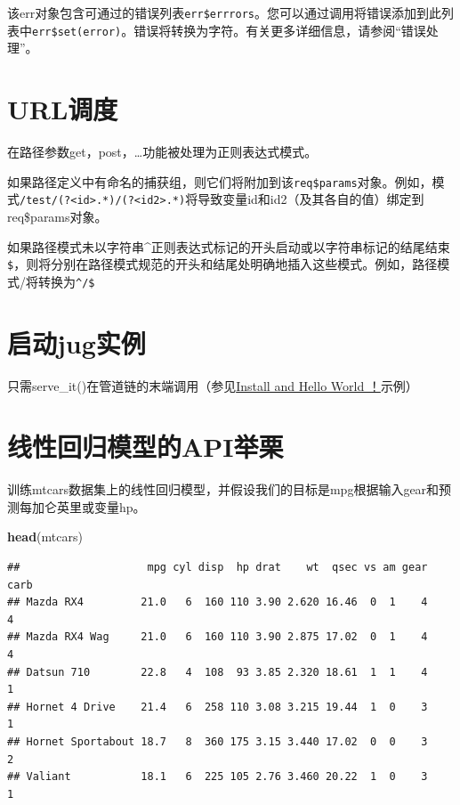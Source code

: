 \documentclass[]{book}
\newenvironment{Shaded}{\begin{snugshade}}{\end{snugshade}}
\newcommand{\KeywordTok}[1]{\textcolor[rgb]{0.13,0.29,0.53}{\textbf{#1}}}
\newcommand{\NormalTok}[1]{#1}
\begin{document}
该err对象包含可通过的错误列表\texttt{err\$errrors}。您可以通过调用将错误添加到此列表中\texttt{err\$set(error)}。错误将转换为字符。有关更多详细信息，请参阅``错误处理''。

\section{URL调度}\label{url}

在路径参数get，post，\ldots{}功能被处理为正则表达式模式。

如果路径定义中有命名的捕获组，则它们将附加到该\texttt{req\$params}对象。例如，模式\texttt{/test/(?\textless{}id\textgreater{}.*)/(?\textless{}id2\textgreater{}.*)}将导致变量id和id2（及其各自的值）绑定到req\$params对象。

如果路径模式未以字符串\^{}正则表达式标记的开头启动或以字符串标记的结尾结束\texttt{\$}，则将分别在路径模式规范的开头和结尾处明确地插入这些模式。例如，路径模式/将转换为\texttt{\^{}/\$}

\section{启动jug实例}\label{jug}

只需serve\_it()在管道链的末端调用（参见\protect\hyperlink{install-and-hello-world}{Install
and Hello World ！}示例）

\section{线性回归模型的API举栗}\label{api}

训练mtcars数据集上的线性回归模型，并假设我们的目标是mpg根据输入gear和预测每加仑英里或变量hp。

\begin{Shaded}
\begin{Highlighting}[]
\KeywordTok{head}\NormalTok{(mtcars)}
\end{Highlighting}
\end{Shaded}

\begin{verbatim}
##                    mpg cyl disp  hp drat    wt  qsec vs am gear carb
## Mazda RX4         21.0   6  160 110 3.90 2.620 16.46  0  1    4    4
## Mazda RX4 Wag     21.0   6  160 110 3.90 2.875 17.02  0  1    4    4
## Datsun 710        22.8   4  108  93 3.85 2.320 18.61  1  1    4    1
## Hornet 4 Drive    21.4   6  258 110 3.08 3.215 19.44  1  0    3    1
## Hornet Sportabout 18.7   8  360 175 3.15 3.440 17.02  0  0    3    2
## Valiant           18.1   6  225 105 2.76 3.460 20.22  1  0    3    1
\end{verbatim}
\end{document}

